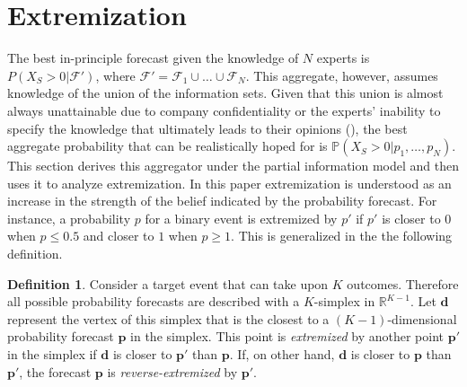 \documentclass[11pt,twoside]{article}
\renewcommand{\P}{\mathbb{P}}
\theoremstyle{definition}
\theoremstyle{definition}
\newtheorem{definition}[theorem]{Definition}
\begin{document}
\section{Extremization}
\label{extremization}
The best in-principle forecast given the knowledge of $N$ experts is $P(X_{S} > 0 |  \mathcal{F}')$, where $\mathcal{F}' = \mathcal{F}_1 \cup \dots \cup \mathcal{F}_N$. This aggregate, however, assumes knowledge of the union of the information sets. Given that this union is almost always unattainable due to company confidentiality or the experts' inability to specify the knowledge that ultimately leads to their opinions (\cite{dawid1995coherent}), the best aggregate probability that can be realistically hoped for is  $\P(X_{S} > 0 | p_1, \dots, p_N)$. This section derives this aggregator under the partial information model and then uses it to analyze extremization.  In this paper extremization is understood as an increase in the strength of the belief indicated by the probability forecast. For instance, a probability $p$ for a binary event is extremized by $p'$ if $p'$ is closer to $0$ when $p \leq 0.5$ and closer to $1$ when $p \geq 1$.  This is generalized in the the following definition.
\begin{definition}
Consider a target event that can take upon $K$ outcomes. Therefore all possible probability forecasts are described with a $K$-simplex in $\mathbb{R}^{K-1}$. Let $\boldsymbol{d}$ represent the vertex of this simplex that is the closest to a $(K-1)$-dimensional probability forecast $\boldsymbol{p}$ in the simplex. This point is \textit{extremized} by another point $\boldsymbol{p}'$ in the simplex if $\boldsymbol{d}$ is closer to $\boldsymbol{p}'$ than $\boldsymbol{p}$. If, on other hand, $\boldsymbol{d}$ is closer to $\boldsymbol{p}$ than $\boldsymbol{p}'$, the forecast $\boldsymbol{p}$ is \textit{reverse-extremized} by $\boldsymbol{p}'$.
\end{definition}
\end{document}
